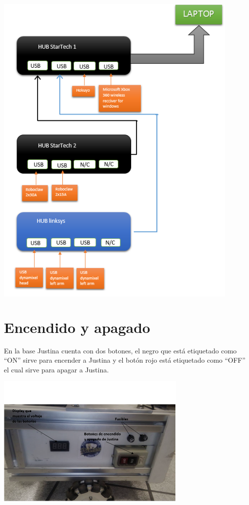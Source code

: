 \documentclass[user_manual.tex]{subfiles}
\begin{document}
\begin{center}
\includegraphics[width=0.9\textwidth]{Figures/Hardware/Diagramas/HUB.png}
\label{fig:Hardware:Diagramas:Justina:HUBs}
\end{center}


\section{Encendido y apagado}

En la base Justina cuenta con dos botones, el negro que está etiquetado como ``ON'' sirve para encender a Justina y el botón
rojo está etiquetado como ``OFF'' el cual sirve para apagar a Justina.\\

\begin{center}
\includegraphics[width=0.7\textwidth]{Figures/Hardware/Diagramas/Encendido.png}
\label{fig:Hardware:Diagramas:Justina:Encendido}
\end{center}
\end{document}
